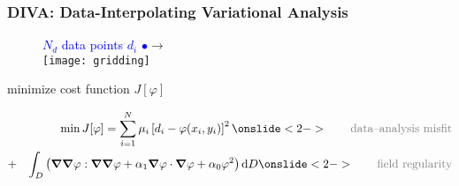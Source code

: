 \begin{frame}[t]
\frametitle{DIVA: Data-Interpolating Variational Analysis}
\footnotesize

\begin{figure}[H]
\textcolor{blue}{$N_{d}$ data points $d_{i}$ $\bullet$}\quad $\rightarrow$ \quad{\textcolor{gray}{gridded field}}\\
\centering
\texttt{[image: gridding]}
\end{figure}

 minimize cost function $J[\varphi]$


\begin{eqnarray*}
& &\min {J}[\varphi] = \sum_{i=1}^{N}\mu_i \left[d_{i}-\varphi(x_{i},y_{i})\right]^{2} \onslide<2->{\qquad\textcolor{gray}{\textrm{data--analysis misfit}}}\\
	  &+& \int_{{D}}\left(
{\nablab}{\nablab}\varphi : {\nablab}{\nablab}\varphi + { \alpha_{1}}
{\nablab}\varphi \cdot {\nablab}\varphi + \alpha_{0} \varphi^{2} \right) \ddiff {D} \onslide<2->{\qquad\textcolor{gray}{\textrm{field regularity}}}
\end{eqnarray*}

\end{frame}


